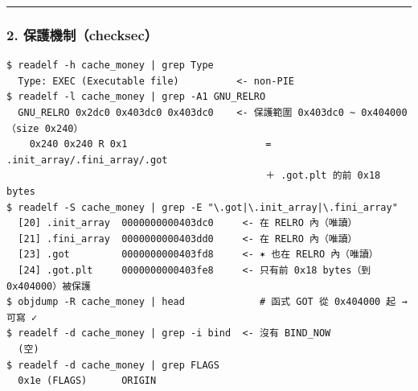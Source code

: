 \documentclass[10pt,a4paper]{article}
\begin{document}
\begin{center}\rule{0.5\linewidth}{0.5pt}\end{center}

\subsubsection{2.
保護機制（checksec）}\label{ux4fddux8b77ux6a5fux5236checksec}

\begin{Verbatim}[breaklines=true,breakanywhere=true,breakautoindent=false,fontsize=\fontsize{7.0}{9.5}\selectfont]
$ readelf -h cache_money | grep Type
  Type: EXEC (Executable file)          <- non-PIE
$ readelf -l cache_money | grep -A1 GNU_RELRO
  GNU_RELRO 0x2dc0 0x403dc0 0x403dc0    <- 保護範圍 0x403dc0 ~ 0x404000（size 0x240）
    0x240 0x240 R 0x1                        = .init_array/.fini_array/.got
                                             ＋ .got.plt 的前 0x18 bytes
$ readelf -S cache_money | grep -E "\.got|\.init_array|\.fini_array"
  [20] .init_array  0000000000403dc0     <- 在 RELRO 內（唯讀）
  [21] .fini_array  0000000000403dd0     <- 在 RELRO 內（唯讀）
  [23] .got         0000000000403fd8     <- ✶ 也在 RELRO 內（唯讀）
  [24] .got.plt     0000000000403fe8     <- 只有前 0x18 bytes（到 0x404000）被保護
$ objdump -R cache_money | head             # 函式 GOT 從 0x404000 起 → 可寫 ✓
$ readelf -d cache_money | grep -i bind  <- 沒有 BIND_NOW
  (空)
$ readelf -d cache_money | grep FLAGS
  0x1e (FLAGS)      ORIGIN
\end{Verbatim}
\end{document}
